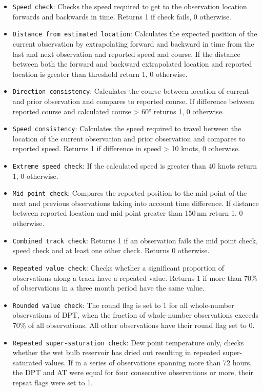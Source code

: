 {\begin{itemize}[resume]
\item \texttt{Speed check}: Checks the speed required to get to the observation location forwards and backwards in time. Returns 1 if check fails, 0 otherwise.
\item \texttt{Distance from estimated location}: Calculates the expected position of the current observation by extrapolating forward and backward in time from the last and next observation and reported speed and course. If the distance between both the forward and backward extrapolated location and reported location is greater than threshold return 1, 0 otherwise.
\item \texttt{Direction consistency}: Calculates the course between location of current and prior observation and compares to reported course. If difference between reported course and calculated course > 60° returns 1, 0 otherwise.
\item \texttt{Speed consistency}: Calculates the speed required to travel between the location of the current observation and prior observation and compares to reported speed. Returns 1 if difference in speed > 10 knots, 0 otherwise.
\item \texttt{Extreme speed check}: If the calculated speed is greater than 40 knots return 1, 0 otherwise.
\item \texttt{Mid point check}: Compares the reported position to the mid point of the next and previous observations taking into account time difference. If distance between reported location and mid point greater than 150\,nm return 1, 0 otherwise.
\item \texttt{Combined track check}: Returns 1 if an observation fails the mid point check, speed check and at least one other check. Returns 0 otherwise.
\item \texttt{Repeated value check}: Checks whether a significant proportion of observations along a track have a repeated value. Returns 1 if more than 70\% of observations in a three month period have the same value.
\item \texttt{Rounded value check}: The round flag is set to 1 for all whole-number observations of DPT, when the fraction of whole-number observations exceeds 70\% of all observations. All other observations have their round flag set to 0.
\item \texttt{Repeated super-saturation check}: Dew point temperature only, checks whether the wet bulb reservoir has dried out resulting in repeated super-saturated values. If in a series of observations spanning more than 72 hours, the DPT and AT were equal for four consecutive observations or more, their repsat flags were set to 1.

\end{itemize}}
